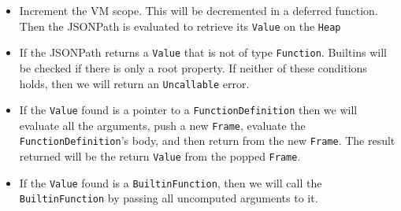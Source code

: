 \begin{itemize}
    \item Increment the VM scope. This will be decremented in a deferred function. Then the JSONPath is evaluated to retrieve its \verb|Value| on the \verb|Heap|
    \item If the JSONPath returns a \verb|Value| that is not of type \verb|Function|. Builtins will be checked if there is only a root property. If neither of these conditions holds, then we will return an \verb|Uncallable| error.
    \item If the \verb|Value| found is a pointer to a \verb|FunctionDefinition| then we will evaluate all the arguments, push a new \verb|Frame|, evaluate the \verb|FunctionDefinition|'s body, and then return from the new \verb|Frame|. The result returned will be the return \verb|Value| from the popped \verb|Frame|.
    \item If the \verb|Value| found is a \verb|BuiltinFunction|, then we will call the \verb|BuiltinFunction| by passing all uncomputed arguments to it.
\end{itemize}
